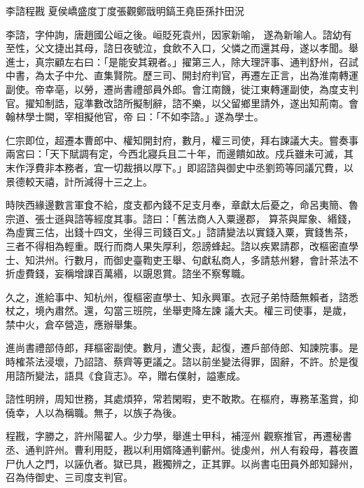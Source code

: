 
\begin{pinyinscope}

 李諮程戡
 夏侯嶠盛度丁度張觀鄭戩明鎬王堯臣孫抃田況



 李諮，字仲詢，唐趙國公峘之後。峘貶死袁州，因家新喻，
 遂為新喻人。諮幼有至性，父文捷出其母，諮日夜號泣，食飲不入口，父憐之而還其母，遂以孝聞。舉進士，真宗顧左右曰：「是能安其親者。」擢第三人，除大理評事、通判舒州，召試中書，為太子中允、直集賢院。歷三司、開封府判官，再遷左正言，出為淮南轉運副使。帝幸亳，以勞，遷尚書禮部員外郎。會江南饑，徙江東轉運副使，為度支判官。擢知制誥，寇準數改諮所擬制辭，諮不樂，以父留鄉里請外，遂出知荊南。會翰林學士闕，宰相擬他官，帝
 曰：「不如李諮。」遂為學士。



 仁宗即位，超遷本曹郎中、權知開封府，數月，權三司使，拜右諫議大夫。嘗奏事兩宮曰：「天下賦調有定，今西北寢兵且二十年，而邊饋如故。戍兵雖未可滅，其末作浮費非本務者，宜一切裁損以厚下。」即詔諮與御史中丞劉筠等同議冗費，以景德較天禧，計所減得十三之上。



 時陜西緣邊數言軍食不給，度支都內錢不足支月奉，章獻太后憂之，命呂夷簡、魯宗道、張士遜與諮等經度其事。諮曰：「舊法商人入粟邊郡，
 算茶與犀象、緡錢，為虛實三估，出錢十四文，坐得三司錢百文。」諮請變法以實錢入粟，實錢售茶，三者不得相為輕重。既行而商人果失厚利，怨謗蜂起。諮以疾累請郡，改樞密直學士、知洪州。行數月，而御史臺鞫吏王舉、句獻私商人，多請慈州礬，會計茶法不折虛費錢，妄稱增課百萬緡，以覬恩賞。諮坐不察奪職。



 久之，進給事中、知杭州，復樞密直學士、知永興軍。衣冠子弟恃蔭無賴者，諮悉杖之，境內肅然。還，勾當三班院，坐舉吏降左諫
 議大夫。權三司使事，是歲，禁中火，倉卒營造，應辦舉集。



 進尚書禮部侍郎，拜樞密副使。數月，遭父喪，起復，遷戶部侍郎、知諫院事。是時榷茶法浸壞，乃詔諮、蔡齊等更議之。諮以前坐變法得罪，固辭，不許。於是復用諮所變法，語具《食貨志》。卒，贈右僕射，謚憲成。



 諮性明辨，周知世務，其處煩猝，常若閑暇，吏不敢欺。在樞府，專務革濫賞，抑僥幸，人以為稱職。無子，以族子為後。



 程戡，字勝之，許州陽翟人。少力學，舉進士甲科，補涇州
 觀察推官，再遷秘書丞、通判許州。曹利用貶，戡以利用婿降通判蘄州。徙虔州，州人有殺母，暮夜置尸仇人之門，以誣仇者。獄已具，戡獨辨之，正其罪。以尚書屯田員外郎知歸州，召為侍御史、三司度支判官。




\end{pinyinscope}
